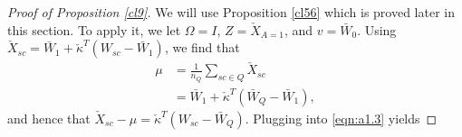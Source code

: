     

\begin{proof}[Proof of Proposition \ref{cl9}]

We will use Proposition \ref{cl56} which is proved later in this section. To apply it, we let $\Omega = I$, $Z = \check{X}_{A=1}$, and $v = \bar{W}_0$. Using  $\check{X}_{sc} = \bar{W}_1 + \check{\kappa}^T(W_{sc} - \bar{W}_1)$, we find that 
\begin{align}
    \nonumber \mu & = \frac{1}{n_Q} \sum_{sc \in Q} \check{X}_{sc} \\
    \label{eqn:cl9.mu} & = \bar{W}_1 + \check{\kappa}^T(\bar{W}_Q - \bar{W}_1),
\end{align}
and hence that $\check{X}_{sc} - \mu = \check{\kappa}^T(W_{sc} - \bar{W}_Q)$. Plugging into \eqref{eqn:a1.3} yields 


\end{proof}
